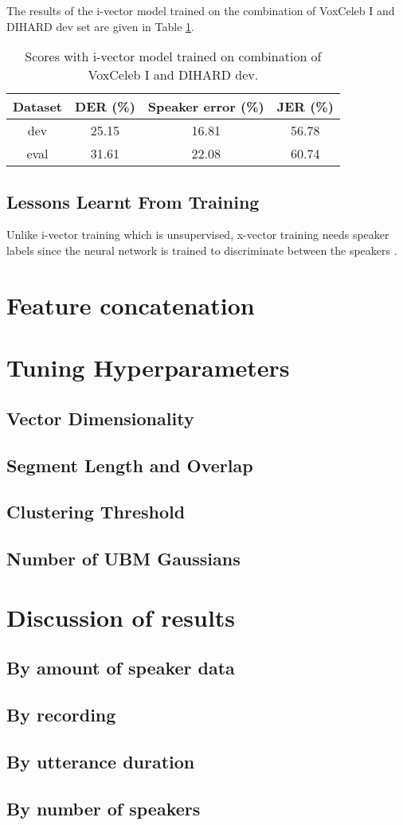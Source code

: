 		The results of the i-vector model trained on the combination of VoxCeleb I and DIHARD dev set are given in Table \ref{table-voxdev-ivec}.
		
		\begin{table}[h]
			\centering
			\begin{tabular}{|c|c|c|c|}
				\hline
				Dataset & DER (\%) & Speaker error (\%) & JER (\%) \\
				\hline
				dev & 25.15 & 16.81 & 56.78 \\
				\hline
				eval & 31.61 & 22.08 & 60.74 \\
				\hline
			\end{tabular}
			\caption{Scores with i-vector model trained on combination of VoxCeleb I and DIHARD dev.}
			\label{table-voxdev-ivec}
		\end{table}
		
		\subsection{Lessons Learnt From Training}
		Unlike i-vector training which is unsupervised, x-vector training needs speaker labels since the neural network is trained to discriminate between the speakers \cite{stafylakis2019self}.
		
	\section{Feature concatenation}
	
	\section{Tuning Hyperparameters}
		\subsection{Vector Dimensionality}
		\subsection{Segment Length and Overlap}
		\subsection{Clustering Threshold}
		\subsection{Number of UBM Gaussians}
	
	\section{Discussion of results}
		\subsection{By amount of speaker data}
		\subsection{By recording}
		\subsection{By utterance duration}
		\subsection{By number of speakers}